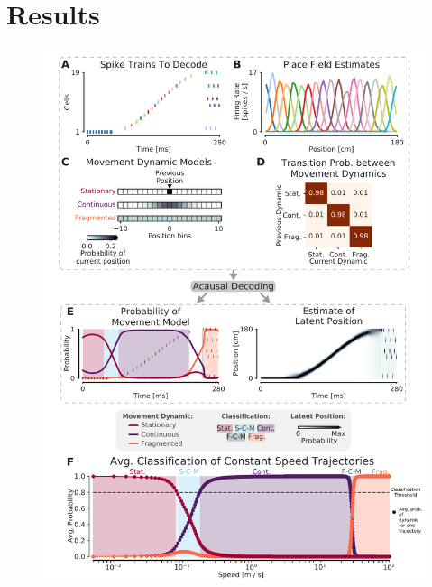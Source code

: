 \documentclass[times, twoside]{zHenriquesLab-StyleBioRxiv}
\begin{document}
\section*{Results}
\begin{figure}%
\centering
\includegraphics[width=0.80\linewidth]{figures/Figure1/Figure1_v6}

\end{figure}
\end{document}
